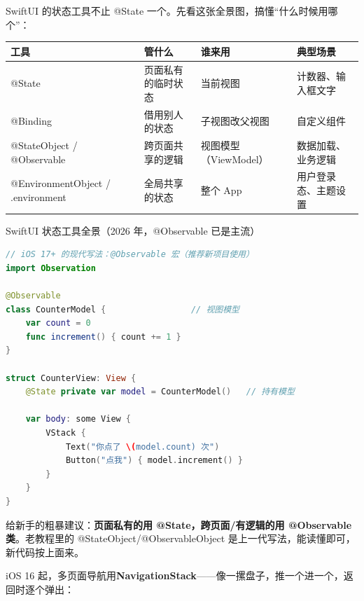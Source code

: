 


SwiftUI 的状态工具不止 @State 一个。先看这张全景图，搞懂“什么时候用哪个”：

\begin{center}
\begin{tabularx}{\linewidth}{|X|X|X|X|}
\hline
\textbf{工具} & \textbf{管什么} & \textbf{谁来用} & \textbf{典型场景} \tabularnewline
\hline
@State & 页面私有的临时状态 & 当前视图 & 计数器、输入框文字 \tabularnewline
@Binding & 借用别人的状态 & 子视图改父视图 & 自定义组件 \tabularnewline
@StateObject / @Observable & 跨页面共享的逻辑 & 视图模型（ViewModel） & 数据加载、业务逻辑 \tabularnewline
@EnvironmentObject / .environment & 全局共享的状态 & 整个 App & 用户登录态、主题设置 \tabularnewline
\hline
\end{tabularx}
\end{center}

\begin{center}\small\color{gray}SwiftUI 状态工具全景（2026 年，@Observable 已是主流）\end{center}

\begin{lstlisting}[language=Swift]
// iOS 17+ 的现代写法：@Observable 宏（推荐新项目使用）
import Observation

@Observable
class CounterModel {                 // 视图模型
    var count = 0
    func increment() { count += 1 }
}

struct CounterView: View {
    @State private var model = CounterModel()   // 持有模型

    var body: some View {
        VStack {
            Text("你点了 \(model.count) 次")
            Button("点我") { model.increment() }
        }
    }
}
\end{lstlisting}

给新手的粗暴建议：\textbf{页面私有的用 @State，跨页面/有逻辑的用 @Observable 类}。老教程里的 @StateObject/@ObservableObject 是上一代写法，能读懂即可，新代码按上面来。


iOS 16 起，多页面导航用\textbf{NavigationStack}——像一摞盘子，推一个进一个，返回时逐个弹出：

